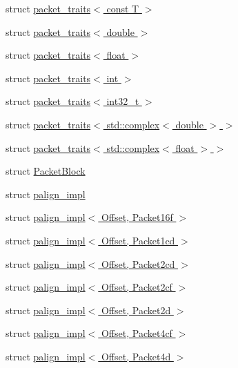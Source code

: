 \begin{DoxyCompactItemize}
\item 
struct \hyperlink{struct_eigen_1_1internal_1_1packet__traits_3_01const_01_t_01_4}{packet\+\_\+traits$<$ const T $>$}
\item 
struct \hyperlink{struct_eigen_1_1internal_1_1packet__traits_3_01double_01_4}{packet\+\_\+traits$<$ double $>$}
\item 
struct \hyperlink{struct_eigen_1_1internal_1_1packet__traits_3_01float_01_4}{packet\+\_\+traits$<$ float $>$}
\item 
struct \hyperlink{struct_eigen_1_1internal_1_1packet__traits_3_01int_01_4}{packet\+\_\+traits$<$ int $>$}
\item 
struct \hyperlink{struct_eigen_1_1internal_1_1packet__traits_3_01int32__t_01_4}{packet\+\_\+traits$<$ int32\+\_\+t $>$}
\item 
struct \hyperlink{struct_eigen_1_1internal_1_1packet__traits_3_01std_1_1complex_3_01double_01_4_01_4}{packet\+\_\+traits$<$ std\+::complex$<$ double $>$ $>$}
\item 
struct \hyperlink{struct_eigen_1_1internal_1_1packet__traits_3_01std_1_1complex_3_01float_01_4_01_4}{packet\+\_\+traits$<$ std\+::complex$<$ float $>$ $>$}
\item 
struct \hyperlink{struct_eigen_1_1internal_1_1_packet_block}{Packet\+Block}
\item 
struct \hyperlink{struct_eigen_1_1internal_1_1palign__impl}{palign\+\_\+impl}
\item 
struct \hyperlink{struct_eigen_1_1internal_1_1palign__impl_3_01_offset_00_01_packet16f_01_4}{palign\+\_\+impl$<$ Offset, Packet16f $>$}
\item 
struct \hyperlink{struct_eigen_1_1internal_1_1palign__impl_3_01_offset_00_01_packet1cd_01_4}{palign\+\_\+impl$<$ Offset, Packet1cd $>$}
\item 
struct \hyperlink{struct_eigen_1_1internal_1_1palign__impl_3_01_offset_00_01_packet2cd_01_4}{palign\+\_\+impl$<$ Offset, Packet2cd $>$}
\item 
struct \hyperlink{struct_eigen_1_1internal_1_1palign__impl_3_01_offset_00_01_packet2cf_01_4}{palign\+\_\+impl$<$ Offset, Packet2cf $>$}
\item 
struct \hyperlink{struct_eigen_1_1internal_1_1palign__impl_3_01_offset_00_01_packet2d_01_4}{palign\+\_\+impl$<$ Offset, Packet2d $>$}
\item 
struct \hyperlink{struct_eigen_1_1internal_1_1palign__impl_3_01_offset_00_01_packet4cf_01_4}{palign\+\_\+impl$<$ Offset, Packet4cf $>$}
\item 
struct \hyperlink{struct_eigen_1_1internal_1_1palign__impl_3_01_offset_00_01_packet4d_01_4}{palign\+\_\+impl$<$ Offset, Packet4d $>$}

\end{DoxyCompactItemize}
